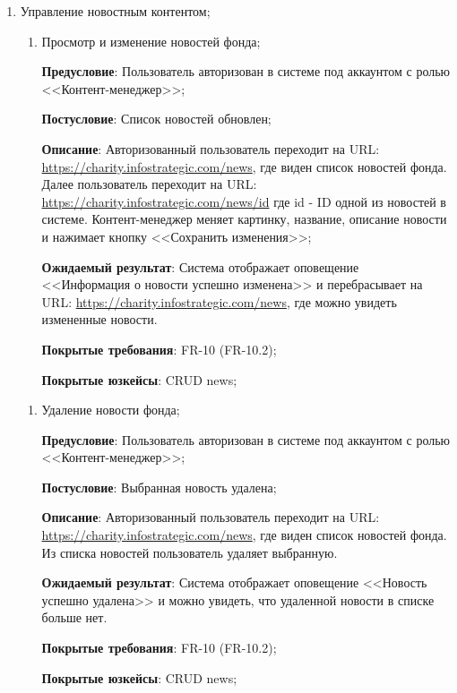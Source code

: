 \begin{enumerate}
    \item Управление новостным контентом;
    
    \begin{enumerate}
        \item Просмотр и изменение новостей фонда;
        
        \textbf{Предусловие}: Пользователь авторизован в системе под аккаунтом с ролью <<Контент-менеджер>>;
        
        \textbf{Постусловие}: Список новостей обновлен;
        
        \textbf{Описание}: Авторизованный пользователь переходит на URL: \url{https://charity.infostrategic.com/news}, где виден список новостей фонда. Далее пользователь переходит на URL: \url{https://charity.infostrategic.com/news/id} где id - ID одной из новостей в системе. Контент-менеджер меняет картинку, название, описание новости и нажимает кнопку <<Сохранить изменения>>;
        
        \textbf{Ожидаемый результат}: Система отображает оповещение <<Информация о новости успешно изменена>> и перебрасывает на URL: \url{https://charity.infostrategic.com/news}, где можно увидеть измененные новости.
        
        \textbf{Покрытые требования}: FR-10 (FR-10.2);
        
        \textbf{Покрытые юзкейсы}: CRUD news;
    \end{enumerate}
    
    \begin{enumerate}
        \item Удаление новости фонда;
        
        \textbf{Предусловие}: Пользователь авторизован в системе под аккаунтом с ролью <<Контент-менеджер>>;
        
        \textbf{Постусловие}: Выбранная новость удалена;
        
        \textbf{Описание}: Авторизованный пользователь переходит на URL: \url{https://charity.infostrategic.com/news}, где виден список новостей фонда. Из списка новостей пользователь удаляет выбранную.
        
        \textbf{Ожидаемый результат}: Система отображает оповещение <<Новость успешно удалена>> и можно увидеть, что удаленной новости в списке больше нет.
        
        \textbf{Покрытые требования}: FR-10 (FR-10.2);
        
        \textbf{Покрытые юзкейсы}: CRUD news;
    \end{enumerate}
    

\end{enumerate}
